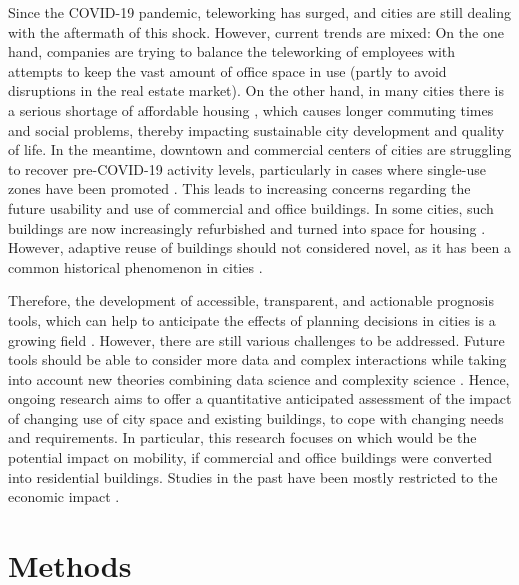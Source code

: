 Since the COVID-19 pandemic, teleworking has surged, and cities are still dealing with the aftermath of this shock. However, current trends are mixed: On the one hand, companies are trying to balance the teleworking of employees with attempts to keep the vast amount of office space in use (partly to avoid disruptions in the real estate market). On the other hand, in many cities there is a serious shortage of affordable housing \citep{Myers2021}, which causes longer commuting times and social problems, thereby impacting sustainable city development and quality of life. In the meantime, downtown and commercial centers of cities are struggling to recover pre-COVID-19 activity levels, particularly in cases where single-use zones have been promoted \citep{Chapple2023TheCities}. This leads to increasing concerns regarding the future usability and use of commercial and office buildings. In some cities, such buildings are now increasingly refurbished and turned into space for housing \citep{EYStrategyandTransactions2023The2023, AjuntamentdeBarcelona2024, Frei2023a, Schneebeli2021a, Rohwetter, Tagesschau, Bloomberg2021a, Meyer2024a}. However, adaptive reuse of buildings should not considered novel, as it has been a common historical phenomenon in cities \citep{Remy2014}.

Therefore, the development of accessible, transparent, and actionable prognosis tools, which can help to anticipate the effects of planning decisions in cities is a growing field \citep{Batty2018}. However, there are still various challenges to be addressed. Future tools should be able to consider more data and complex interactions while taking into account new theories combining data science and complexity science \citep{Caldarelli2023}. 
Hence, ongoing research aims to offer a quantitative anticipated assessment of the impact of changing use 
of city space and existing buildings, to cope with changing needs and requirements. In particular, this research focuses on which would be the potential impact on mobility, if commercial and office buildings were converted into residential buildings. Studies in the past have been mostly restricted to the economic impact \citep{EYStrategyandTransactions2023The2023, Remy2014}.

\section{Methods}
\label{sec:ETRCO2H_methods}

